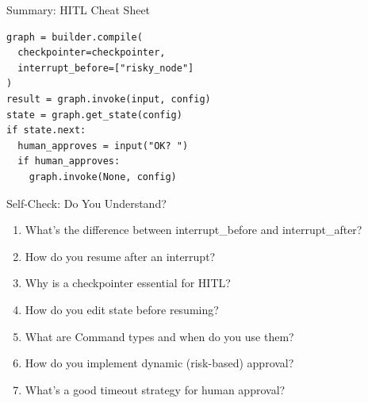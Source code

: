 \documentclass[aspectratio=169,11pt]{beamer}
\begin{document}
\begin{frame}[fragile]{Summary: HITL Cheat Sheet}
  \begin{codebox}
    \begin{lstlisting}
graph = builder.compile(
  checkpointer=checkpointer,
  interrupt_before=["risky_node"]
)
result = graph.invoke(input, config)
state = graph.get_state(config)
if state.next:
  human_approves = input("OK? ")
  if human_approves:
    graph.invoke(None, config)
    \end{lstlisting}
  \end{codebox}
\end{frame}

\begin{frame}{Self-Check: Do You Understand?}
  \begin{enumerate}
    \setlength{\itemsep}{1pt}
    \item What's the difference between interrupt\_before and interrupt\_after?
    \item How do you resume after an interrupt?
    \item Why is a checkpointer essential for HITL?
    \item How do you edit state before resuming?
    \item What are Command types and when do you use them?
    \item How do you implement dynamic (risk-based) approval?
    \item What's a good timeout strategy for human approval?
  \end{enumerate}
\end{frame}
\end{document}
